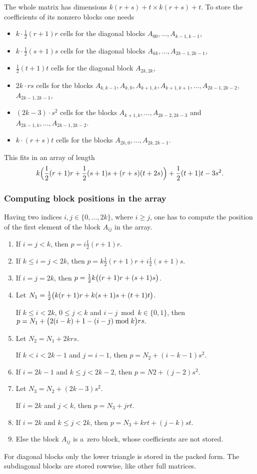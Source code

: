 The whole matrix has dimensions $k(r+s)+t\times k(r+s)+t$. To store the
coefficients of its nonzero blocks one needs
\begin{itemize}
  \item $k\cdot\frac{1}{2}(r+1)r$ cells for the diagonal blocks
    $A_{00},\ldots,A_{k-1,k-1}$,
  \item $k\cdot\frac{1}{2}(s+1)s$ cells for the diagonal blocks
    $A_{kk},\ldots,A_{2k-1,2k-1}$,
  \item $\frac{1}{2}(t+1)t$ cells for the diagonal block $A_{2k,2k}$,
  \item \raggedright
    $2k\cdot rs$ cells for the blocks $A_{k,k-1},A_{k,0},A_{k+1,k},A_{k+1,k+1},%
    \ldots,\allowbreak A_{2k-1,2k-2},$ \\ $A_{2k-1,2k-1}$,
  \item $(2k-3)\cdot s^2$ cells for the blocks $A_{k+1,k},\ldots,A_{2k-2,2k-3}$
    and $A_{2k-1,k},\ldots,A_{2k-1,2k-2}$.
  \item $k\cdot(r+s)t$ cells for the blocks $A_{2k,0},\ldots,A_{2k,2k-1}$.
\end{itemize}
This fits in an array of length
\begin{align*}
k\Bigl(\frac{1}{2}(r+1)r+\frac{1}{2}(s+1)s+(r+s)(t+2s)\Bigr)+\frac{1}{2}(t+1)t-3s^2.
\end{align*}


\subsubsection*{Computing block positions in the array}

Having two indices $i,j\in\{0,\ldots,2k\}$, where $i\geq j$, one has to
compute the position of the first element of the block $A_{ij}$
in the array.
\begin{enumerate}
  \item If $i=j<k$, then $p=i\frac{1}{2}(r+1)r$.
  \item If $k\leq i=j<2k$, then $p=k\frac{1}{2}(r+1)r+i\frac{1}{2}(s+1)s$.
  \item If $i=j=2k$, then $p=\frac{1}{2}k\bigl((r+1)r+(s+1)s\bigr)$.
  \item Let $N_1=\frac{1}{2}\bigl( k(r+1)r+k(s+1)s+(t+1)t\bigr)$.

    If $k\leq i<2k$, $0\leq j<k$ and $i-j\bmod k\in\{0,1\}$, then \\
    $p=N_1+\bigl( 2(i-k)+1-(i-j)\bmod k\bigr) rs.$
  \item Let $N_2=N_1+2krs$.

    If $k<i<2k-1$ and $j=i-1$, then $p=N_2+(i-k-1)s^2$.
  \item If $i=2k-1$ and $k\leq j<2k-2$, then $p=N2+(j-2)s^2$.
  \item Let $N_3=N_2+(2k-3)s^2$.

    If $i=2k$ and $j<k$, then $p=N_3+jrt$.
  \item If $i=2k$ and $k\leq j<2k$, then $p=N_3+krt+(j-k)st$.
  \item Else the block $A_{ij}$ is a~zero block, whose coefficients
    are not stored.
\end{enumerate}
For diagonal blocks only the lower triangle is stored in the packed form.
The subdiagonal blocks are stored rowwise, like other full matrices.


